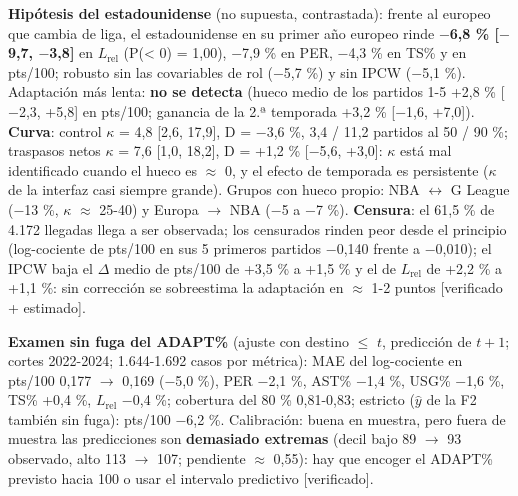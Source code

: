 \documentclass[10pt,a4paper]{article}
\begin{document}
\textbf{Hipótesis del estadounidense} (no supuesta, contrastada): frente al europeo que cambia de liga, el estadounidense en su primer año europeo rinde \textbf{\ensuremath{-}6,8 \% [\ensuremath{-}9,7, \ensuremath{-}3,8]} en $L_{\mathrm{rel}}$ (P(< 0) = 1,00), \ensuremath{-}7,9 \% en PER, \ensuremath{-}4,3 \% en TS\% y en pts/100; robusto sin las covariables de rol (\ensuremath{-}5,7 \%) y sin IPCW (\ensuremath{-}5,1 \%). Adaptación más lenta: \textbf{no se detecta} (hueco medio de los partidos 1-5 +2,8 \% [\ensuremath{-}2,3, +5,8] en pts/100; ganancia de la 2.ª temporada +3,2 \% [\ensuremath{-}1,6, +7,0]). \textbf{Curva}: control \ensuremath{\kappa} = 4,8 [2,6, 17,9], D = \ensuremath{-}3,6 \%, 3,4 / 11,2 partidos al 50 / 90 \%; traspasos netos \ensuremath{\kappa} = 7,6 [1,0, 18,2], D = +1,2 \% [\ensuremath{-}5,6, +3,0]: \ensuremath{\kappa} está mal identificado cuando el hueco es \ensuremath{\approx} 0, y el efecto de temporada es persistente (\ensuremath{\kappa} de la interfaz casi siempre grande). Grupos con hueco propio: NBA \ensuremath{\leftrightarrow} G League (\ensuremath{-}13 \%, \ensuremath{\kappa} \ensuremath{\approx} 25-40) y Europa \ensuremath{\to} NBA (\ensuremath{-}5 a \ensuremath{-}7 \%). \textbf{Censura}: el 61,5 \% de 4.172 llegadas llega a ser observada; los censurados rinden peor desde el principio (log-cociente de pts/100 en sus 5 primeros partidos \ensuremath{-}0,140 frente a \ensuremath{-}0,010); el IPCW baja el \ensuremath{\Delta} medio de pts/100 de +3,5 \% a +1,5 \% y el de $L_{\mathrm{rel}}$ de +2,2 \% a +1,1 \%: sin corrección se sobreestima la adaptación en \ensuremath{\approx} 1-2 puntos [verificado + estimado].

\textbf{Examen sin fuga del ADAPT\%} (ajuste con destino \ensuremath{\leq} $t$, predicción de $t+1$; cortes 2022-2024; 1.644-1.692 casos por métrica): MAE del log-cociente en pts/100 0,177 \ensuremath{\to} 0,169 (\ensuremath{-}5,0 \%), PER \ensuremath{-}2,1 \%, AST\% \ensuremath{-}1,4 \%, USG\% \ensuremath{-}1,6 \%, TS\% +0,4 \%, $L_{\mathrm{rel}}$ \ensuremath{-}0,4 \%; cobertura del 80 \% 0,81-0,83; estricto (\ensuremath{\hat y} de la F2 también sin fuga): pts/100 \ensuremath{-}6,2 \%. Calibración: buena en muestra, pero fuera de muestra las predicciones son \textbf{demasiado extremas} (decil bajo 89 \ensuremath{\to} 93 observado, alto 113 \ensuremath{\to} 107; pendiente \ensuremath{\approx} 0,55): hay que encoger el ADAPT\% previsto hacia 100 o usar el intervalo predictivo [verificado].
\end{document}
